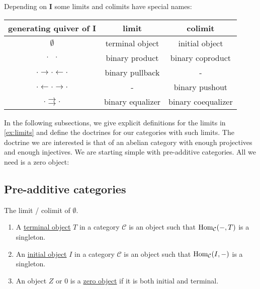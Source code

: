 \begin{example}\label{ex:limits}
Depending on \textbf{I} some limits and colimits have special names:
\begin{center}
\begin{tabular}{c|c|c}
generating quiver of $\mathbf{I}$ & limit & colimit \\
\hline
$\emptyset$ & terminal object & initial object \\
$\cdot \text{\phantom{$\rightarrow$}} \cdot$ & binary product & binary coproduct \\
$\cdot \rightarrow \cdot \leftarrow \cdot$ & binary pullback & - \\
$\cdot \leftarrow \cdot \rightarrow \cdot$  & - & binary pushout \\
$ \cdot \rightrightarrows \cdot$ & binary equalizer & binary coequalizer
\end{tabular}
\end{center}
\end{example}

In the following subsections, we give explicit definitions for the limits in \ref{ex:limits} and define the
doctrines for our categories with such limits. The doctrine we are interested is that of an abelian category with
enough projectives and enough injectives.
We are starting simple with pre-additive categories. All we need is a zero object:

\subsection{Pre-additive categories}

\begin{remark}\label{def:init_term_zero_object}
The limit / colimit of $\emptyset$.\\
\renewcommand{\labelenumi}{(\theenumi)}
\begin{enumerate}
\item A \ul{terminal object} $T$ in a category $\mathcal{C}$ is an object such that $\textup{Hom}_{\mathcal{C}}(-,T)$ is a singleton.
\item An \ul{initial object} $I$ in a category $\mathcal{C}$ is an object such that $\textup{Hom}_{\mathcal{C}}(I,-)$ is a singleton.
\item An object $Z$ or $0$ is a \ul{zero object} if it is both initial and terminal.
\end{enumerate}
\end{remark}


